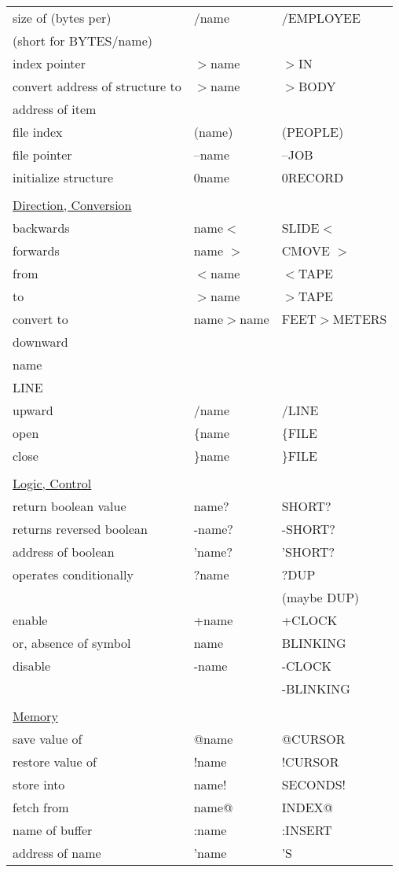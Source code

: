 \begin{tabular}{lll}
size of (bytes per)&/name&/EMPLOYEE\\
(short for BYTES/name)\\
index pointer&\(>\)name&\(>\)IN\\
convert address of structure to&\(>\)name&\(>\)BODY\\
address of item\\
file index&(name)&(PEOPLE)\\
file pointer&--name&--JOB\\
initialize structure&0name&0RECORD\\
\\
\underline{Direction, Conversion}\\
backwards&name\(<\)&SLIDE\(<\)\\
forwards&name \(>\)&CMOVE \(>\)\\
from&\(<\)name&\(<\)TAPE\\
to&\(>\)name&\(>\)TAPE\\
convert to&name\(>\)name&FEET\(>\)METERS\\
downward&\\name&\\LINE\\
upward&/name&/LINE\\
open&\{name&\{FILE\\
close&\}name&\}FILE\\
\\
\underline{Logic, Control}\\
return boolean value&name?&SHORT?\\
returns reversed boolean&-name?&-SHORT?\\
address of boolean&'name?&'SHORT?\\
operates conditionally&?name&?DUP\\
&&(maybe DUP)\\
enable&+name&+CLOCK\\
or, absence of symbol&name&BLINKING\\
disable&-name&-CLOCK\\
&&-BLINKING\\
\\
\underline{Memory}\\
save value of&@name&@CURSOR\\
restore value of&!name&!CURSOR\\
store into&name!&SECONDS!\\
fetch from&name@&INDEX@\\
name of buffer&:name&:INSERT\\
address of name&'name&'S\\

\end{tabular}
